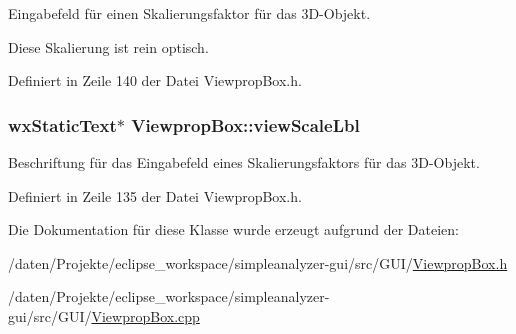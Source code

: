Eingabefeld für einen Skalierungsfaktor für das 3\-D-\/\-Objekt. 

Diese Skalierung ist rein optisch. 

Definiert in Zeile 140 der Datei Viewprop\-Box.\-h.

\hypertarget{classViewpropBox_ab312348ae97369e3b8a1a7ce8ba9e2b1}{
\subsubsection[{view\-Scale\-Lbl}]{\setlength{\rightskip}{0pt plus 5cm}wx\-Static\-Text$\ast$ Viewprop\-Box\-::view\-Scale\-Lbl\hspace{0.3cm}{\ttfamily [private]}}}\label{classViewpropBox_ab312348ae97369e3b8a1a7ce8ba9e2b1}


Beschriftung für das Eingabefeld eines Skalierungsfaktors für das 3\-D-\/\-Objekt. 



Definiert in Zeile 135 der Datei Viewprop\-Box.\-h.



Die Dokumentation für diese Klasse wurde erzeugt aufgrund der Dateien\-:\begin{DoxyCompactItemize}
\item 
/daten/\-Projekte/eclipse\-\_\-workspace/simpleanalyzer-\/gui/src/\-G\-U\-I/\hyperlink{ViewpropBox_8h}{Viewprop\-Box.\-h}\item 
/daten/\-Projekte/eclipse\-\_\-workspace/simpleanalyzer-\/gui/src/\-G\-U\-I/\hyperlink{ViewpropBox_8cpp}{Viewprop\-Box.\-cpp}\end{DoxyCompactItemize}
